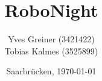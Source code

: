 \begin{titlepage}

	\titlehead
	{
		\texttt{[image: images/logos/HTW]}		
		\hfill
		\texttt{[image: images/logos/mindstorms]}		
	}
	
	\subject
	{
		\Huge Dokumentation
	}
	
	\title
	{
		RoboNight
	}
	
	\author
	{	
		Yves Greiner (3421422)\\
		Tobias Kalmes (3525899)
	}
	
	\date
	{
		\normalsize{Saarbrücken, \today}
	}	
	\maketitle	
\end{titlepage}
